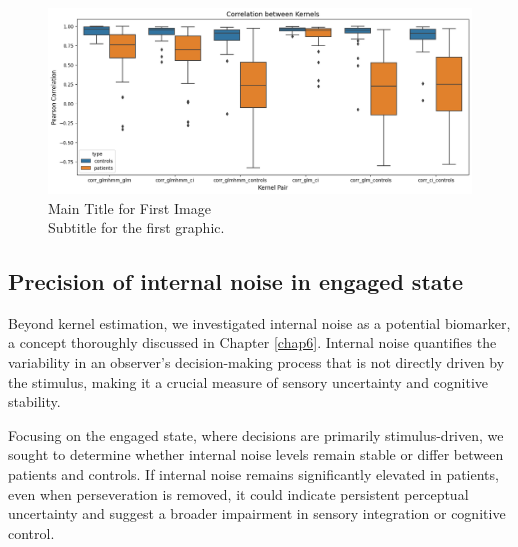 \begin{figure}[H]
    \centering
    \includegraphics[width=14cm]{MainLayout/Images/chapter7/corr.png}
    \caption{Main Title for First Image \\ \small Subtitle for the first graphic.}
    \label{fig:corr}
\end{figure}

\subsection{Precision of internal noise in engaged state}
Beyond kernel estimation, we investigated internal noise as a potential biomarker, a concept thoroughly discussed in Chapter \ref{chap6}. Internal noise quantifies the variability in an observer’s decision-making process that is not directly driven by the stimulus, making it a crucial measure of sensory uncertainty and cognitive stability.

Focusing on the engaged state, where decisions are primarily stimulus-driven, we sought to determine whether internal noise levels remain stable or differ between patients and controls. If internal noise remains significantly elevated in patients, even when perseveration is removed, it could indicate persistent perceptual uncertainty and suggest a broader impairment in sensory integration or cognitive control.


